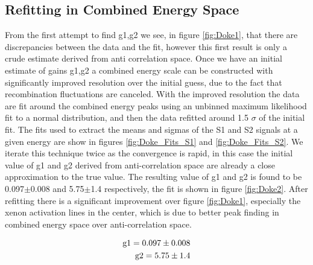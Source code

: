 \subsection{Refitting in Combined Energy Space}
From the first attempt to find g1,g2 we see, in figure \ref{fig:Doke1}, that there are discrepancies between the data and the fit, however this first result is only a crude estimate derived from anti correlation space. Once we have an initial estimate of gains g1,g2 a combined energy scale can be constructed with significantly improved resolution over the initial guess, due to the fact that recombination fluctuations are canceled. With the improved resolution the data are fit around the combined energy peaks using an unbinned maximum likelihood fit to a normal distribution, and then the data refitted around 1.5 $\sigma$ of the initial fit. The fits used to extract the means and sigmas  of the S1 and S2 signals at a given energy are show in figures \ref{fig:Doke_Fits_S1} and \ref{fig:Doke_Fits_S2}. We iterate this technique twice as the convergence is rapid, in this case the initial value of g1 and g2 derived from anti-correlation space are already a close approximation to the true value. The resulting value of g1 and g2 is found to be 0.097$\pm$0.008 and 5.75$\pm$1.4 respectively, the fit is shown in figure \ref{fig:Doke2}. After refitting there is a significant improvement over figure \ref{fig:Doke1}, especially the xenon activation lines in the center, which is due to better peak finding in combined energy space over anti-correlation space.


\begin{equation}
\begin{split}
\rm  g1 = 0.097\pm0.008 \\
\rm  g2= 5.75\pm1.4
\label{eq:g1g2Fit}
\end{split}
\end{equation}


